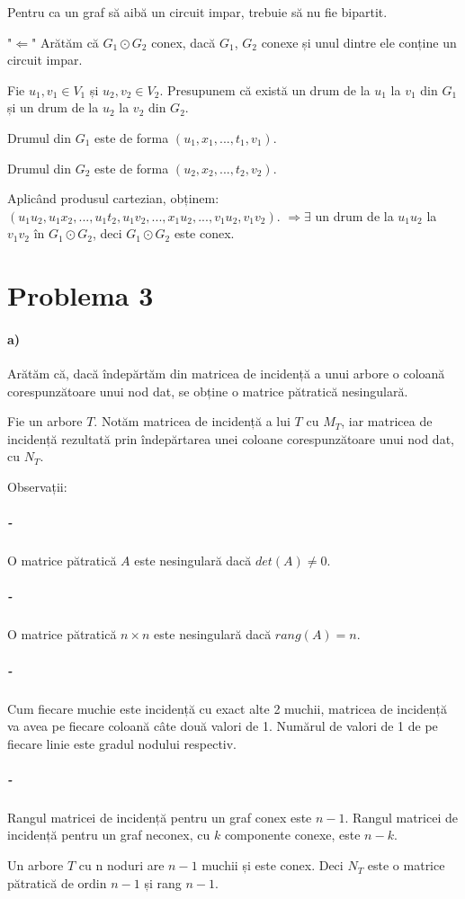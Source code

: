 \documentclass[paper=a4, fontsize=12pt]{scrartcl}
\begin{document}
Pentru ca un graf să aibă un circuit impar, trebuie să nu fie bipartit.

\bigskip
"$\Leftarrow$" Arătăm că $G_1 \odot G_2$ conex, dacă $G_1$, $G_2$ conexe și unul dintre ele conține un circuit impar.

Fie $u_1, v_1 \in V_1$ și $u_2, v_2 \in V_2$.
Presupunem că există un drum de la $u_1$ la $v_1$ din $G_1$ și
un drum de la $u_2$ la $v_2$ din $G_2$.

Drumul din $G_1$ este de forma $(u_1, x_1, ..., t_1, v_1)$.

Drumul din $G_2$ este de forma $(u_2, x_2, ..., t_2, v_2)$.

Aplicând produsul cartezian, obținem:
$(u_1u_2, u_1x_2, ..., u_1t_2, u_1v_2, ..., x_1u_2, ..., v_1u_2, v_1v_2)$.
$\Rightarrow \exists$ un drum de la $u_1u_2$ la $v_1v_2$ în $G_1 \odot G_2$, deci $G_1 \odot G_2$ este conex. 
   
\section*{Problema 3}
\paragraph{a)}
Arătăm că, dacă îndepărtăm din matricea de incidență a unui arbore o coloană corespunzătoare unui nod dat, se obține o matrice pătratică nesingulară.

Fie un arbore $T$. Notăm matricea de incidență a lui $T$ cu $M_T$, iar matricea de incidență rezultată prin îndepărtarea unei coloane corespunzătoare unui nod dat, cu $N_T$.

Observații:
\vspace{-1.3em}
\subparagraph{-}
O matrice pătratică $A$ este nesingulară dacă $det(A) \neq 0$.
\vspace{-1.3em}
\subparagraph{-}
O matrice pătratică $n \times n$ este nesingulară dacă $rang(A) = n$.
\vspace{-1.3em}
\subparagraph{-}
Cum fiecare muchie este incidență cu exact alte 2 muchii, matricea de incidență va avea pe fiecare coloană câte două valori de 1. Numărul de valori de 1 de pe fiecare linie este gradul nodului respectiv.
\vspace{-1.3em}
\subparagraph{-}
Rangul matricei de incidență pentru un graf conex este $n-1$. Rangul matricei de incidență pentru un graf neconex, cu $k$ componente conexe, este $n-k$.

Un arbore $T$ cu n noduri are $n-1$ muchii și este conex. Deci $N_T$ este o matrice pătratică de ordin $n-1$ și rang $n-1$.
\end{document}
